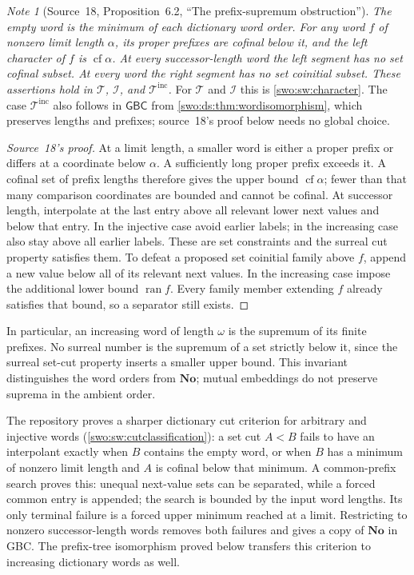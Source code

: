 \documentclass[11pt]{article}
\theoremstyle{definition}
\theoremstyle{remark}
\newtheorem{note}[note]{Note}
\newcommand{\No}{\mathbf{No}}
\newcommand{\Words}{\mathcal I}
\newcommand{\WordsAll}{\mathcal T}
\newcommand{\ran}{\operatorname{ran}}
\newcommand{\cf}{\operatorname{cf}}
\newcommand{\GBC}{\mathsf{GBC}}
\newcommand{\WordsInc}{\mathcal T^{\mathrm{inc}}}
\begin{document}
\begin{note}[Source~18, Proposition~6.2, ``The prefix-supremum obstruction'']\label{swo:sh:prop:dictionary-characters}
\emph{
The empty word is the minimum of each dictionary word order. For any
word $f$ of nonzero limit length $\alpha$, its proper prefixes are
cofinal below it, and the left character of $f$ is $\cf\alpha$.
At every successor-length word the left segment has no set cofinal
subset. At every word the right segment has no set coinitial subset.
These assertions hold in $\WordsAll$, $\Words$, and $\WordsInc$.} For
$\WordsAll$ and $\Words$ this is \cref{swo:sw:character}. The case
$\WordsInc$ also follows in $\GBC$ from \cref{swo:ds:thm:wordisomorphism},
which preserves lengths and prefixes; source~18's proof below needs no global
choice.
\end{note}
\begin{proof}[Source~18's proof]
At a limit length, a smaller word is either a proper prefix or differs
at a coordinate below $\alpha$. A sufficiently long proper prefix
exceeds it. A cofinal set of prefix lengths therefore gives the upper
bound $\cf\alpha$; fewer than that many comparison coordinates are
bounded and cannot be cofinal. At successor length, interpolate at
the last entry above all relevant lower next values and below that
entry. In the injective case avoid earlier labels; in the increasing
case also stay above all earlier labels. These are set constraints
and the surreal cut property satisfies them. To defeat a proposed
set coinitial family above $f$, append a new value below all of its
relevant next values. In the increasing case impose the additional
lower bound $\ran f$. Every family member extending $f$ already
satisfies that bound, so a separator still exists.
\end{proof}

In particular, an increasing word of length $\omega$ is the supremum
of its finite prefixes. No surreal number is the supremum of a set
strictly below it, since the surreal set-cut property inserts a
smaller upper bound. This invariant distinguishes the word orders
from $\No$; mutual embeddings do not preserve suprema in the ambient
order.

The repository proves a sharper dictionary cut criterion for arbitrary
and injective words (\cref{swo:sw:cutclassification}): a set cut $A<B$ fails to have
an interpolant exactly when $B$ contains the empty word, or when
$B$ has a minimum of nonzero limit length and $A$ is cofinal below
that minimum. A common-prefix search proves this: unequal next-value
sets can be separated, while a forced common entry is appended; the
search is bounded by the input word lengths. Its only terminal failure
is a forced upper minimum reached at a limit. Restricting to nonzero
successor-length words removes both failures and gives a copy of
$\No$ in GBC. The prefix-tree isomorphism proved below transfers this
criterion to increasing dictionary words as well.
\end{document}
